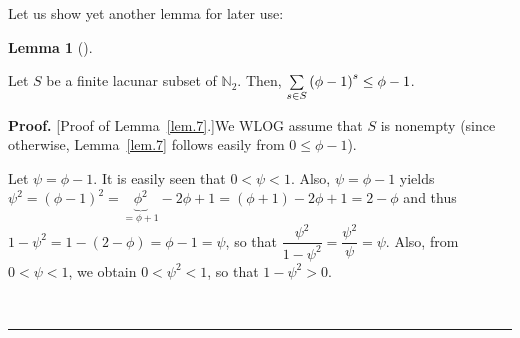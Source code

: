 \documentclass[numbers=enddot,12pt,final,onecolumn,notitlepage]{scrartcl}%
\numberwithin{exer}{section}
\theoremstyle{definition}
\newtheorem{lem}[theo]{Lemma}
\newenvironment{lemma}[1][]
{\begin{lem}[#1]\begin{leftbar}}
{\end{leftbar}\end{lem}}
\newenvironment{proof}[1][Proof]{\noindent\textbf{#1.} }{\ \rule{0.5em}{0.5em}}
\let\sumnonlimits\sum
\renewcommand{\sum}{\sumnonlimits\limits}
\begin{document}
Let us show yet another lemma for later use:

\begin{lemma}
\label{lem.7} Let $S$ be a finite lacunar subset of $\mathbb{N}_{2}$. Then,
$\sum\limits_{s\in S}\left(  \phi-1\right)  ^{s}\leq\phi-1$.
\end{lemma}

\begin{proof}
[Proof of Lemma~\ref{lem.7}.]We WLOG assume that $S$ is nonempty (since
otherwise, Lemma~\ref{lem.7} follows easily from $0\leq\phi-1$).

Let $\psi=\phi-1$. It is easily seen that $0<\psi<1$. Also, $\psi=\phi-1$
yields $\psi^{2}=\left(  \phi-1\right)  ^{2}=\underbrace{\phi^{2}}_{=\phi
+1}-2\phi+1=\left(  \phi+1\right)  -2\phi+1=2-\phi$ and thus $1-\psi
^{2}=1-\left(  2-\phi\right)  =\phi-1=\psi$, so that $\dfrac{\psi^{2}}%
{1-\psi^{2}}=\dfrac{\psi^{2}}{\psi}=\psi$. Also, from $0<\psi<1$, we obtain
$0<\psi^{2}<1$, so that $1-\psi^{2}>0$.


\end{proof}
\end{document}
